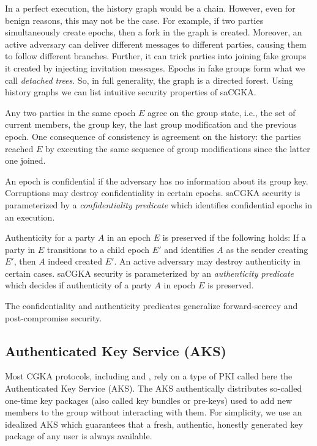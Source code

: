 In a perfect execution, the history graph would be a chain. However, even for
benign reasons, this may not be the case. For example, if two parties
simultaneously create epochs, then a fork in the graph is created. Moreover,
an active adversary can deliver different messages to different parties,
causing them to follow different branches. Further, it can trick parties into
joining fake groups it created by injecting invitation messages. Epochs in
fake groups form what we call \emph{detached trees}. So, in full generality,
the graph is a directed forest.
%
Using history graphs we can list intuitive security properties of saCGKA.
\begin{description}[itemsep=2pt,topsep=2pt,parsep=2pt]
  \item[Consistency] Any two parties in the same epoch $E$ agree on the group state, i.e., the set of current members, the group key, the last group modification and the previous epoch. One consequence of consistency is agreement on the history: the parties reached $E$ by executing the same sequence of group modifications since the latter one joined.
  \item[Confidentiality] An epoch is confidential if the adversary has no information about its group key. Corruptions may destroy confidentiality in certain epochs. saCGKA security is parameterized by a \emph{confidentiality predicate} which identifies confidential epochs in an execution.
  \item[Authenticity] Authenticity for a party $A$ in an epoch $E$ is preserved if the following holds: If a party in $E$ transitions to a child epoch $E'$ and identifies $A$ as the sender creating $E'$, then $A$ indeed created $E'$. An active adversary may destroy authenticity in certain cases. saCGKA security is parameterized by an \emph{authenticity predicate} which decides if authenticity of a party $A$ in epoch $E$ is preserved.
\end{description}
The confidentiality and authenticity predicates generalize forward-secrecy and post-compromise security.

\subsection{Authenticated Key Service (AKS)}
Most CGKA protocols, including \protITK and \saik, rely on a type of PKI called here the Authenticated Key Service (AKS). The AKS authentically distributes so-called one-time key packages (also called key bundles or pre-keys) used to add new members to the group without interacting with them. For simplicity, we use an idealized AKS which guarantees that a fresh, authentic, honestly generated key package of any user is always available.

